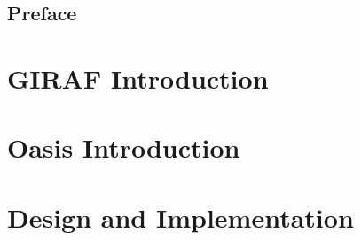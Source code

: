 




\clearpage{\thispagestyle{empty}\cleardoublepage}

\thispagestyle{empty}

\clearpage{\thispagestyle{empty}\cleardoublepage}

\thispagestyle{empty}

\thispagestyle{empty}
\clearpage{\thispagestyle{empty}\cleardoublepage}


\chapter*{Preface}


\cleardoublepage
\tableofcontents*

\clearpage{\thispagestyle{empty}\cleardoublepage}


\part{GIRAF Introduction}
\clearpage{\thispagestyle{empty}\cleardoublepage}
\label{chap:giraf_introduction}


\clearpage{\thispagestyle{empty}\cleardoublepage}
\part{Oasis Introduction}
\clearpage{\thispagestyle{empty}\cleardoublepage}

\clearpage{\thispagestyle{empty}\cleardoublepage}


\part{Design and Implementation}
\clearpage{\thispagestyle{empty}\cleardoublepage}


\clearpage{\thispagestyle{empty}\cleardoublepage}

\clearpage{\thispagestyle{empty}\cleardoublepage}



\clearpage{\thispagestyle{empty}\cleardoublepage}
